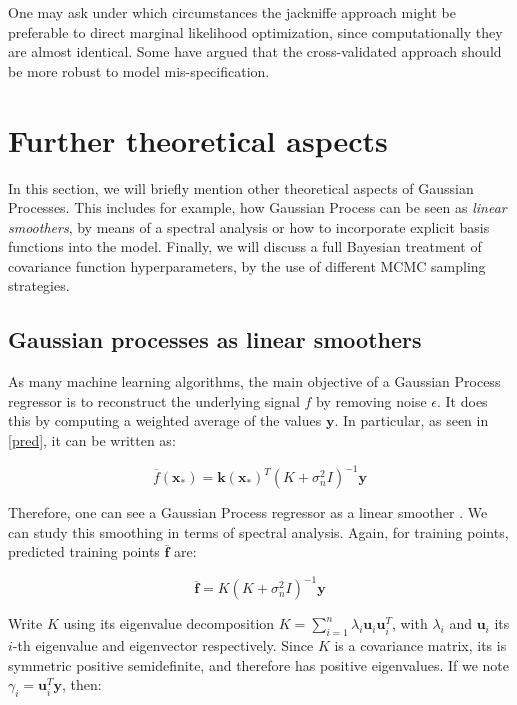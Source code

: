 \documentclass[10pt,a4paper,twoside]{book}
\begin{document}
One may ask under which circumstances the jackniffe approach might be preferable to direct marginal likelihood optimization, since computationally they are almost identical. Some have argued \cite{Wahba1991} that the cross-validated approach should be more robust to model mis-specification.

\section{Further theoretical aspects}

In this section, we will briefly mention other theoretical aspects of Gaussian Processes. This includes for example, how Gaussian Process can be seen as \textit{linear smoothers}, by means of a spectral analysis or how to incorporate explicit basis functions into the model. Finally, we will discuss a full Bayesian treatment of covariance function hyperparameters, by the use of different MCMC sampling strategies.

\subsection{Gaussian processes as linear smoothers}

As many machine learning algorithms, the main objective of a Gaussian Process regressor is to reconstruct the underlying signal $f$ by removing noise $\epsilon$. It does this by computing a weighted average of the values $\boldsymbol{y}$. In particular, as seen in \ref{pred}, it can be written as:

\begin{equation}
\overline{f}(\boldsymbol{x}_*) = \boldsymbol{k}(\boldsymbol{x}_*)^T(K + \sigma_n^2 I)^{-1}\boldsymbol{y}
\end{equation}

Therefore, one can see a Gaussian Process regressor as a linear smoother \cite{BUJA1989}. We can study this smoothing in terms of spectral analysis. Again, for training points, predicted training points $\overline{\boldsymbol{f}}$ are:

\begin{equation}
\overline{\boldsymbol{f}} = K(K + \sigma_n^2 I)^{-1}\boldsymbol{y}
\end{equation}

Write $K$ using its eigenvalue decomposition $K = \sum_{i=1}^n \lambda_i \boldsymbol{u}_i\boldsymbol{u}_i^T$, with $\lambda_i$ and $\boldsymbol{u}_i$ its $i$-th eigenvalue and eigenvector respectively. Since $K$ is a covariance matrix, its is symmetric positive semidefinite, and therefore has positive eigenvalues. If we note $\gamma_i = \boldsymbol{u}_i^T\boldsymbol{y}$, then:
\end{document}
